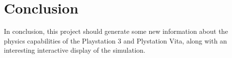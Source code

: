 \documentclass[conference]{acmsiggraph}
\begin{document}
\section{Conclusion}
In conclusion, this project should generate some new information about the physics capabilities of the Playstation 3 and Plystation Vita, along with an interesting interactive display of the simulation.






\end{document}
